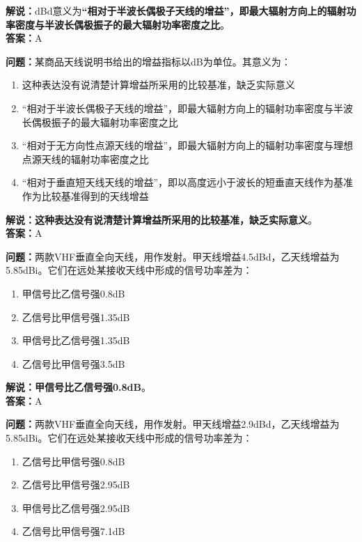\textbf{解说：}dBd意义为\textbf{“相对于半波长偶极子天线的增益”，即最大辐射方向上的辐射功率密度与半波长偶极振子的最大辐射功率密度之比}。\\\textbf{答案：}A



\textbf{问题：}某商品天线说明书给出的增益指标以dB为单位。其意义为：

\begin{enumerate}[label=\Alph*), leftmargin=1cm]
	\item 这种表达没有说清楚计算增益所采用的比较基准，缺乏实际意义
	\item “相对于半波长偶极子天线的增益”，即最大辐射方向上的辐射功率密度与半波长偶极振子的最大辐射功率密度之比
	\item “相对于无方向性点源天线的增益”，即最大辐射方向上的辐射功率密度与理想点源天线的辐射功率密度之比
	\item “相对于垂直短天线天线的增益”，即以高度远小于波长的短垂直天线作为基准作为比较基准得到的天线增益
\end{enumerate}

\textbf{解说：这种表达没有说清楚计算增益所采用的比较基准，缺乏实际意义}。\\\textbf{答案：}A



\textbf{问题：}两款VHF垂直全向天线，用作发射。甲天线增益4.5dBd，乙天线增益为5.85dBi。它们在远处某接收天线中形成的信号功率差为：

\begin{enumerate}[label=\Alph*), leftmargin=1cm]
	\item 甲信号比乙信号强0.8dB
	\item 乙信号比甲信号强1.35dB
	\item 甲信号比乙信号强1.35dB
	\item 乙信号比甲信号强3.5dB
\end{enumerate}

\textbf{解说：甲信号比乙信号强0.8dB}。\\\textbf{答案：}A%



\textbf{问题：}两款VHF垂直全向天线，用作发射。甲天线增益2.9dBd，乙天线增益为5.85dBi。它们在远处某接收天线中形成的信号功率差为：

\begin{enumerate}[label=\Alph*), leftmargin=1cm]
	\item 乙信号比甲信号强0.8dB
	\item 乙信号比甲信号强2.95dB
	\item 甲信号比乙信号强2.95dB
	\item 乙信号比甲信号强7.1dB
\end{enumerate}

